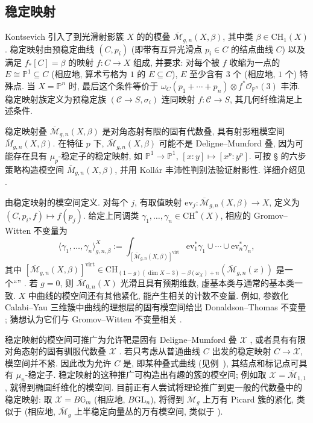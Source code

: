 \subsection{稳定映射}\label{src:10.1.2-subsection}
Kontsevich 引入了到光滑射影簇 $X$ 的的模叠 $\overline{\mathcal M}_{g,n}(X,\beta)$, 其中类 $\beta\in\mathrm{CH}_1(X)$ \cite{Kon95}. 稳定映射由预稳定曲线 $(C,p_i)$ (即带有互异光滑点 $p_i\in C$ 的结点曲线 $C$) 以及满足 $f_*[C]=\beta$ 的映射 $f:C\to X$ 组成, 并要求: 对每个被 $f$ 收缩为一点的 $E\cong\mathbb P^1\subseteq C$ (相应地, 算术亏格为 $1$ 的 $E\subseteq C$), $E$ 至少含有 $3$ 个 (相应地, $1$ 个) 特殊点. 当 $X=\mathbb P^n$ 时, 最后这个条件等价于 $\omega_C(p_1+\cdots+p_n)\otimes f^*\mathcal O_{\mathbb P^n}(3)$ 丰沛. 稳定映射族定义为预稳定族 $(\mathcal C\to S,\sigma_i)$ 连同映射 $f:\mathcal C\to S$, 其几何纤维满足上述条件.

稳定映射叠 $\overline{\mathcal M}_{g,n}(X,\beta)$ 是对角态射有限的固有代数叠, 具有射影粗模空间 $\overline M_{g,n}(X,\beta)$. 在特征 $p$ 下, $\overline{\mathcal M}_{g,n}(X,\beta)$ 可能不是 Deligne--Mumford 叠, 因为可能存在具有 $\mu_p$-稳定子的稳定映射, 如 $\mathbb P^1\to\mathbb P^1$, $[x:y]\mapsto[x^p:y^p]$. 可按 \S{} 的六步策略构造模空间 $\overline M_{g,n}(X,\beta)$, 并用 Koll\'ar 丰沛性判别法验证射影性. 详细介绍见 \cite{FP97}.

由稳定映射的模空间定义. 对每个 $j$, 有取值映射 $\mathrm{ev}_j:\overline{\mathcal M}_{g,n}(X,\beta)\to X$, 定义为 $(C,p_i,f)\mapsto f(p_j)$. 给定上同调类 $\gamma_1,\ldots,\gamma_n\in\mathrm{CH}^*(X)$, 相应的 Gromov--Witten 不变量为
\[
\langle\gamma_1,\ldots,\gamma_n\rangle^X_{g,n,\beta}
:=\int_{[\overline{\mathcal M}_{g,n}(X,\beta)]^{\mathrm{virt}}}
\mathrm{ev}_1^*\gamma_1\cup\cdots\cup\mathrm{ev}_n^*\gamma_n,
\]
其中 $[\overline{\mathcal M}_{g,n}(X,\beta)]^{\mathrm{virt}}\in\mathrm{CH}_{(1-g)(\dim X-3)-\beta(\omega_X)+n}(\overline{\mathcal M}_{g,n}(x))$ 是一个``'' \cite{LT98,BF97}. 若 $g=0$, 则 $\overline{\mathcal M}_{0,n}(X)$ 光滑且具有预期维数, 虚基本类与通常的基本类一致. $X$ 中曲线的模空间还有其他紧化, 能产生相关的计数不变量. 例如, 参数化 Calabi--Yau 三维簇中曲线的理想层的固有模空间给出 Donaldson--Thomas 不变量 \cite{DT98}; 猜想认为它们与 Gromov--Witten 不变量相关 \cite{MNOP06}.

稳定映射的模空间可推广为允许靶是固有 Deligne--Mumford 叠 $\mathcal X$ \cite{AV02}, 或者具有有限对角态射的固有驯服代数叠 $\mathcal X$ \cite{AOV08}. 若只考虑从普通曲线 $C$ 出发的稳定映射 $C\to\mathcal X$, 模空间并不紧. 因此改为允许 $C$ 是, 即某种叠式曲线 (见例~), 其结点和标记点可具有 $\mu_n$-稳定子. 稳定映射的这种推广可构造出有趣的簇的模空间; 例如取 $\mathcal X=\overline{\mathcal M}_{1,1}$, 就得到椭圆纤维化的模空间. 目前正有人尝试将理论推广到更一般的代数叠中的稳定映射: 取 $\mathcal X=B\mathbb G_m$ (相应地, $B\mathrm{GL}_n$), 将得到 $\overline{\mathcal M}_g$ 上万有 Picard 簇的紧化, 类似于 \cite{Cap94} (相应地, $\overline{\mathcal M}_g$ 上半稳定向量丛的万有模空间, 类似于 \cite{Gie84,Pan96,NS99}).
